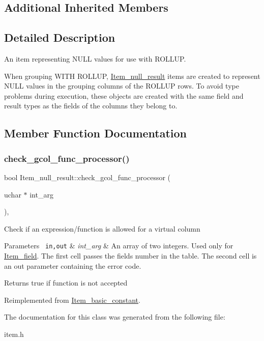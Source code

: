 \subsection*{Additional Inherited Members}


\subsection{Detailed Description}
An item representing N\+U\+LL values for use with R\+O\+L\+L\+UP.

When grouping W\+I\+TH R\+O\+L\+L\+UP, \mbox{\hyperlink{classItem__null__result}{Item\+\_\+null\+\_\+result}} items are created to represent N\+U\+LL values in the grouping columns of the R\+O\+L\+L\+UP rows. To avoid type problems during execution, these objects are created with the same field and result types as the fields of the columns they belong to. 

\subsection{Member Function Documentation}
\mbox{\label{classItem__null__result_a2e623724f3729cea2a1b54c3d5f7dbd4}} 
\subsubsection{\texorpdfstring{check\+\_\+gcol\+\_\+func\+\_\+processor()}{check\_gcol\_func\_processor()}}
{\footnotesize\ttfamily bool Item\+\_\+null\+\_\+result\+::check\+\_\+gcol\+\_\+func\+\_\+processor (\begin{DoxyParamCaption}\item[{uchar $\ast$}]{int\+\_\+arg }\end{DoxyParamCaption})\hspace{0.3cm}{\ttfamily [inline]}, {\ttfamily [virtual]}}

Check if an expression/function is allowed for a virtual column


\begin{DoxyParams}[1]{Parameters}
\mbox{\texttt{ in,out}}  & {\em int\+\_\+arg} & An array of two integers. Used only for \mbox{\hyperlink{classItem__field}{Item\+\_\+field}}. The first cell passes the field\textquotesingle{}s number in the table. The second cell is an out parameter containing the error code.\\
\hline
\end{DoxyParams}
\begin{DoxyReturn}{Returns}
true if function is not accepted 
\end{DoxyReturn}


Reimplemented from \mbox{\hyperlink{classItem__basic__constant_a6240f3253090d2fc91f87a7a1cb773a7}{Item\+\_\+basic\+\_\+constant}}.



The documentation for this class was generated from the following file\+:\begin{DoxyCompactItemize}
\item 
item.\+h\end{DoxyCompactItemize}
